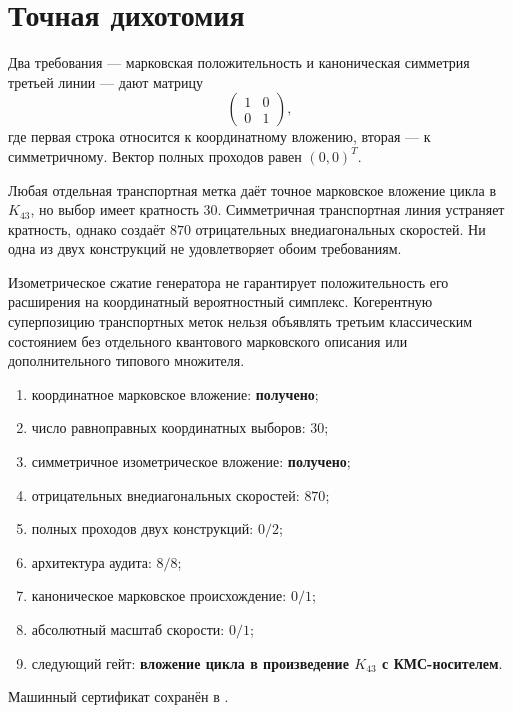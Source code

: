 \section{Точная дихотомия}

Два требования --- марковская положительность и каноническая симметрия
третьей линии --- дают матрицу
\begin{equation}
 \begin{pmatrix}1&0\\0&1\end{pmatrix},
 \label{eq:v10-hopf-embedding-dichotomy}
\end{equation}
где первая строка относится к координатному вложению, вторая --- к
симметричному. Вектор полных проходов равен $(0,0)^T$.

\begin{theorem}
Любая отдельная транспортная метка даёт точное марковское вложение цикла в
$K_{43}$, но выбор имеет кратность $30$. Симметричная транспортная линия
устраняет кратность, однако создаёт $870$ отрицательных внедиагональных
скоростей. Ни одна из двух конструкций не удовлетворяет обоим требованиям.
\end{theorem}

\begin{nogocriterion}
Изометрическое сжатие генератора не гарантирует положительность его
расширения на координатный вероятностный симплекс. Когерентную суперпозицию
транспортных меток нельзя объявлять третьим классическим состоянием без
отдельного квантового марковского описания или дополнительного типового
множителя.
\end{nogocriterion}

\begin{protocol}\begin{enumerate}\raggedright
\item координатное марковское вложение: \textbf{получено};
\item число равноправных координатных выборов: \textbf{$30$};
\item симметричное изометрическое вложение: \textbf{получено};
\item отрицательных внедиагональных скоростей: \textbf{$870$};
\item полных проходов двух конструкций: \textbf{$0/2$};
\item архитектура аудита: \textbf{$8/8$};
\item каноническое марковское происхождение: \textbf{$0/1$};
\item абсолютный масштаб скорости: \textbf{$0/1$};
\item следующий гейт: \textbf{вложение цикла в произведение $K_{43}$ с КМС-носителем}.
\end{enumerate}\end{protocol}

Машинный сертификат сохранён в
.